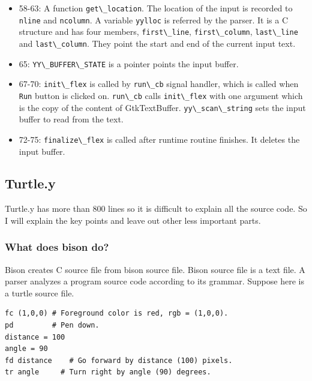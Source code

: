 \begin{itemize}
\tightlist
\item
  58-63: A function \passthrough{\lstinline!get\_location!}. The
  location of the input is recorded to \passthrough{\lstinline!nline!}
  and \passthrough{\lstinline!ncolumn!}. A variable
  \passthrough{\lstinline!yylloc!} is referred by the parser. It is a C
  structure and has four members, \passthrough{\lstinline!first\_line!},
  \passthrough{\lstinline!first\_column!},
  \passthrough{\lstinline!last\_line!} and
  \passthrough{\lstinline!last\_column!}. They point the start and end
  of the current input text.
\item
  65: \passthrough{\lstinline!YY\_BUFFER\_STATE!} is a pointer points
  the input buffer.
\item
  67-70: \passthrough{\lstinline!init\_flex!} is called by
  \passthrough{\lstinline!run\_cb!} signal handler, which is called when
  \passthrough{\lstinline!Run!} button is clicked on.
  \passthrough{\lstinline!run\_cb!} calls
  \passthrough{\lstinline!init\_flex!} with one argument which is the
  copy of the content of GtkTextBuffer.
  \passthrough{\lstinline!yy\_scan\_string!} sets the input buffer to
  read from the text.
\item
  72-75: \passthrough{\lstinline!finalize\_flex!} is called after
  runtime routine finishes. It deletes the input buffer.
\end{itemize}

\hypertarget{turtle.y}{%
\subsection{Turtle.y}\label{turtle.y}}

Turtle.y has more than 800 lines so it is difficult to explain all the
source code. So I will explain the key points and leave out other less
important parts.

\hypertarget{what-does-bison-do}{%
\subsubsection{What does bison do?}\label{what-does-bison-do}}

Bison creates C source file from bison source file. Bison source file is
a text file. A parser analyzes a program source code according to its
grammar. Suppose here is a turtle source file.

\begin{lstlisting}
fc (1,0,0) # Foreground color is red, rgb = (1,0,0).
pd         # Pen down.
distance = 100
angle = 90
fd distance    # Go forward by distance (100) pixels.
tr angle     # Turn right by angle (90) degrees.
\end{lstlisting}

